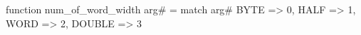 function num_of_word_width arg# = match arg# {
  BYTE => 0,
  HALF => 1,
  WORD => 2,
  DOUBLE => 3
}
